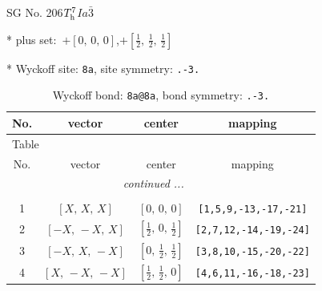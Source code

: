 \documentclass[fleqn,8pt]{jsarticle}
\begin{document}
\setcounter{MaxMatrixCols}{32}

\renewcommand{\tablename}{Table~}
\renewcommand{\figurename}{Figure~}
\begin{center}
\LARGE
SG No. 206\quad$T_{\rm h}^{7}$\quad$Ia\bar{3}$\quad[ cubic ]
\end{center}

* plus set:\,\,\,$+\left[ 0,\, 0,\, 0 \right]$,\quad $+\left[ \frac{1}{2},\, \frac{1}{2},\, \frac{1}{2} \right]$


* Wyckoff site: {\tt 8a}, site symmetry: {\tt .-3.}
\renewcommand{\arraystretch}{1.2}
\begin{longtable}{cccc}
\caption{Wyckoff bond: {\tt 8a@8a}, bond symmetry: {\tt .-3.}}
 \\
 \hline \hline
No. & vector & center & mapping \\ \hline \endfirsthead

\multicolumn{3}{l}{\tablename\ \thetable{}} \\
 \hline \hline
No. & vector & center & mapping \\ \hline \endhead

 \hline \hline
\multicolumn{3}{r}{\footnotesize\it continued ...} \\ \endfoot

 \hline \hline
\multicolumn{3}{r}{} \\ \endlastfoot

1 & $\left[ X,\, X,\, X \right]$ & $\left[ 0,\, 0,\, 0 \right]$ & {\tt [1,5,9,-13,-17,-21]} \\ \hline
2 & $\left[ - X,\, - X,\, X \right]$ & $\left[ \frac{1}{2},\, 0,\, \frac{1}{2} \right]$ & {\tt [2,7,12,-14,-19,-24]} \\ \hline
3 & $\left[ - X,\, X,\, - X \right]$ & $\left[ 0,\, \frac{1}{2},\, \frac{1}{2} \right]$ & {\tt [3,8,10,-15,-20,-22]} \\ \hline
4 & $\left[ X,\, - X,\, - X \right]$ & $\left[ \frac{1}{2},\, \frac{1}{2},\, 0 \right]$ & {\tt [4,6,11,-16,-18,-23]} \\
\end{longtable}
\renewcommand{\arraystretch}{1.2}
\end{document}
